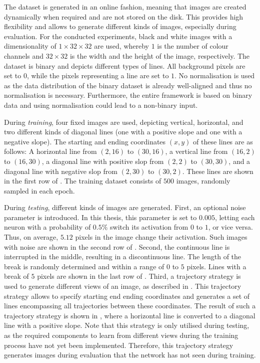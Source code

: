 The dataset is generated in an online fashion, meaning that images are created dynamically when required and are not stored on the disk. This provides high flexibility and allows to generate different kinds of images, especially during evaluation.
For the conducted experiments, black and white images with a dimensionality of $1 \times 32 \times 32$ are used, whereby $1$ is the number of colour channels and $32 \times 32$ is the width and the height of the image, respectively.
The dataset is binary and depicts different types of lines.
All background pixels are set to $0$, while the pixels representing a line are set to $1$.
No normalisation is used as the data distribution of the binary dataset is already well-aligned and thus no normalisation is necessary.
Furthermore, the entire framework is based on binary data and using normalisation could lead to a non-binary input.

During \emph{training}, four fixed images are used, depicting vertical, horizontal, and two different kinds of diagonal lines (one with a positive slope and one with a negative slope). The starting and ending coordinates $(x, y)$ of these lines are as follows: A horizontal line from $(2, 16)$ to $(30, 16)$, a vertical line from $(16, 2)$ to $(16, 30)$, a diagonal line with positive slop from $(2, 2)$ to $(30, 30)$, and a diagonal line with negative slop from $(2, 30)$ to $(30, 2)$. These lines are shown in the first row of .
The training dataset consists of $500$ images, randomly sampled in each epoch.

During \emph{testing}, different kinds of images are generated. 
First, an optional noise parameter is introduced. In this thesis, this parameter is set to $0.005$, letting each neuron with a probability of $0.5\%$ switch its activation from $0$ to $1$, or vice versa. Thus, on average, $5.12$ pixels in the image change their activation. Such images with noise are shown in the second row of .
Second, the continuous line is interrupted in the middle, resulting in a discontinuous line. The length of the break is randomly determined and within a range of $0$ to $5$ pixels. Lines with a break of $5$ pixels are shown in the last row of .
Third, a trajectory strategy is used to generate different views of an image, as described in . This trajectory strategy allows to specify starting end ending coordinates and generates a set of lines encompassing all trajectories between these coordinates.
The result of such a trajectory strategy is shown in , where a horizontal line is converted to a diagonal line with a positive slope. Note that this strategy is only utilised during testing, as the required components to learn from different views during the training process have not yet been implemented. Therefore, this trajectory strategy generates images during evaluation that the network has not seen during training. 

